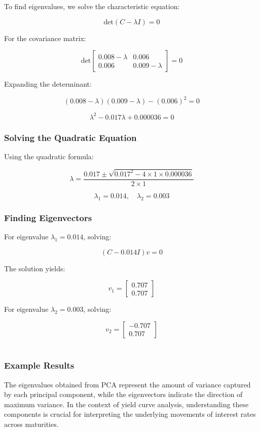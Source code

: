 \documentclass[12pt]{article}
\begin{document}
To find eigenvalues, we solve the characteristic equation:

\[
\text{det}(C - \lambda I) = 0
\]

For the covariance matrix:

\[
\text{det} \begin{bmatrix} 
0.008 - \lambda & 0.006 \\
0.006 & 0.009 - \lambda 
\end{bmatrix} = 0
\]

Expanding the determinant:

\[
(0.008 - \lambda)(0.009 - \lambda) - (0.006)^2 = 0
\]

\[
\lambda^2 - 0.017\lambda + 0.000036 = 0
\]

\subsubsection{Solving the Quadratic Equation}

Using the quadratic formula:

\[
\lambda = \frac{0.017 \pm \sqrt{0.017^2 - 4 \times 1 \times 0.000036}}{2 \times 1}
\]

\[
\lambda_1 = 0.014, \quad \lambda_2 = 0.003
\]

\subsubsection{Finding Eigenvectors}

For eigenvalue \(\lambda_1 = 0.014\), solving:

\[
(C - 0.014I)v = 0
\]

The solution yields:

\[
v_1 = \begin{bmatrix} 
0.707 \\
0.707 
\end{bmatrix}
\]

For eigenvalue \(\lambda_2 = 0.003\), solving:

\[
v_2 = \begin{bmatrix} 
-0.707 \\
0.707 
\end{bmatrix}
\]\\
\subsubsection{Example Results}

The eigenvalues obtained from PCA represent the amount of variance captured by each principal component, while the eigenvectors indicate the direction of maximum variance. In the context of yield curve analysis, understanding these components is crucial for interpreting the underlying movements of interest rates across maturities.
\end{document}
